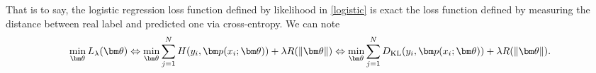 That is to say, the logistic regression loss function defined by likelihood in \eqref{logistic} is exact
the loss function defined by measuring the distance between real label and predicted one via cross-entropy.
We can note 
\begin{equation}\label{key}
\min_{\bm \theta} L_\lambda(\bm \theta) \Leftrightarrow \min_{\bm \theta} \sum_{j=1}^N H(y_i, \bm p(x_i; \bm \theta)) + \lambda R(\|\bm \theta\|) 
\Leftrightarrow \min_{\bm \theta} \sum_{j=1}^N D_{\rm KL}(y_i, \bm p(x_i; \bm \theta)) + \lambda R(\|\bm \theta\|).
\end{equation}



\endinput

%
%
%
%
%
